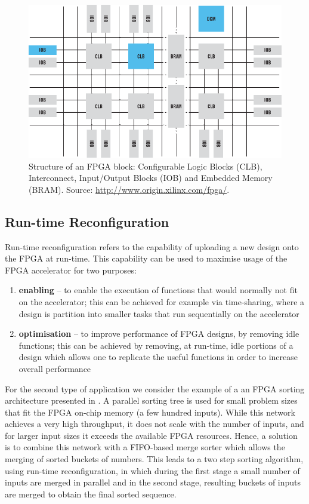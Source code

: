 \begin{figure}[ht!]
\centering
\includegraphics[scale=0.4]{figs/fpga-block-structure.png}
\caption{Structure of an FPGA block: Configurable Logic Blocks (CLB),
  Interconnect, Input/Output Blocks (IOB) and Embedded Memory (BRAM). Source:
  \url{http://www.origin.xilinx.com/fpga/}.}
\label{fig:fpga-block-structure}
\end{figure}

\subsection{Run-time Reconfiguration}
\label{sec:run-time-reconfiguration}
Run-time reconfiguration refers to the capability of uploading a new
design onto the FPGA at run-time. This capability can be used to
maximise usage of the FPGA accelerator for two purposes:
\begin{enumerate}
\item \textbf{enabling} -- to enable the execution of functions that
  would normally not fit on the accelerator; this can be achieved for
  example via time-sharing, where a design is partition into smaller
  tasks that run sequentially on the accelerator\cite{trimberger1998scheduling}
\item \textbf{optimisation} -- to improve performance of FPGA designs,
  by removing idle functions; this can be achieved by removing, at
  run-time, idle portions of a design which allows one to replicate
  the useful functions in order to increase overall performance
\end{enumerate}


For the second type of application we consider the example of a an
FPGA sorting architecture presented in \cite{koch2011fpgasort}. A
parallel sorting tree is used for small problem sizes that fit the
FPGA on-chip memory (a few hundred inputs). While this network
achieves a very high throughput, it does not scale with the number of
inputs, and for larger input sizes it exceeds the available FPGA
resources. Hence, a solution is to combine this network with a
FIFO-based merge sorter\cite{marcelino2009unbalanced} which allows the
merging of sorted buckets of numbers. This leads to a two step sorting
algorithm, using run-time reconfiguration, in which during the first
stage a small number of inputs are merged in parallel and in the
second stage, resulting buckets of inputs are merged to obtain the
final sorted sequence.

